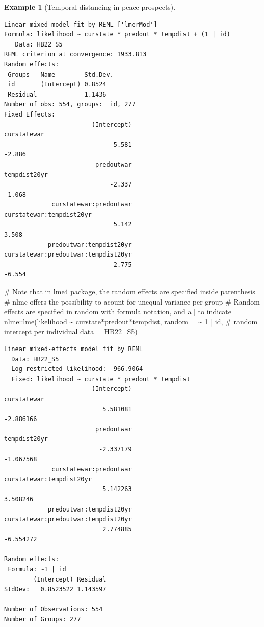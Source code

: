 \documentclass[
  11pt,
  letterpaper,
]{scrbook}
\newenvironment{Shaded}{\begin{snugshade}}{\end{snugshade}}
\newcommand{\AttributeTok}[1]{\textcolor[rgb]{0.40,0.45,0.13}{#1}}
\newcommand{\CommentTok}[1]{\textcolor[rgb]{0.37,0.37,0.37}{#1}}
\newcommand{\DecValTok}[1]{\textcolor[rgb]{0.68,0.00,0.00}{#1}}
\newcommand{\FunctionTok}[1]{\textcolor[rgb]{0.28,0.35,0.67}{#1}}
\newcommand{\NormalTok}[1]{\textcolor[rgb]{0.00,0.23,0.31}{#1}}
\newcommand{\SpecialCharTok}[1]{\textcolor[rgb]{0.37,0.37,0.37}{#1}}
\theoremstyle{definition}
\theoremstyle{definition}
\newtheorem{example}{Example}[chapter]
\theoremstyle{remark}
\begin{document}
\begin{example}[Temporal distancing in peace
prospects]
\begin{verbatim}
Linear mixed model fit by REML ['lmerMod']
Formula: likelihood ~ curstate * predout * tempdist + (1 | id)
   Data: HB22_S5
REML criterion at convergence: 1933.813
Random effects:
 Groups   Name        Std.Dev.
 id       (Intercept) 0.8524  
 Residual             1.1436  
Number of obs: 554, groups:  id, 277
Fixed Effects:
                        (Intercept)                          curstatewar  
                              5.581                               -2.886  
                         predoutwar                         tempdist20yr  
                             -2.337                               -1.068  
             curstatewar:predoutwar             curstatewar:tempdist20yr  
                              5.142                                3.508  
            predoutwar:tempdist20yr  curstatewar:predoutwar:tempdist20yr  
                              2.775                               -6.554  
\end{verbatim}

\begin{Shaded}
\begin{Highlighting}[]
\CommentTok{\#  Note that in \textasciigrave{}lme4\textasciigrave{} package, the random effects are specified inside parenthesis}
\CommentTok{\# nlme offers the possibility to acount for unequal variance per group}
\CommentTok{\# Random effects are specified in \textasciigrave{}random\textasciigrave{} with formula notation, and a | to indicate}
\NormalTok{nlme}\SpecialCharTok{::}\FunctionTok{lme}\NormalTok{(likelihood }\SpecialCharTok{\textasciitilde{}}\NormalTok{ curstate}\SpecialCharTok{*}\NormalTok{predout}\SpecialCharTok{*}\NormalTok{tempdist, }
          \AttributeTok{random =} \SpecialCharTok{\textasciitilde{}} \DecValTok{1} \SpecialCharTok{|}\NormalTok{ id, }\CommentTok{\# random intercept per individual}
          \AttributeTok{data =}\NormalTok{ HB22\_S5)}
\end{Highlighting}
\end{Shaded}

\begin{verbatim}
Linear mixed-effects model fit by REML
  Data: HB22_S5 
  Log-restricted-likelihood: -966.9064
  Fixed: likelihood ~ curstate * predout * tempdist 
                        (Intercept)                         curstatewar 
                           5.581081                           -2.886166 
                         predoutwar                        tempdist20yr 
                          -2.337179                           -1.067568 
             curstatewar:predoutwar            curstatewar:tempdist20yr 
                           5.142263                            3.508246 
            predoutwar:tempdist20yr curstatewar:predoutwar:tempdist20yr 
                           2.774885                           -6.554272 

Random effects:
 Formula: ~1 | id
        (Intercept) Residual
StdDev:   0.8523522 1.143597

Number of Observations: 554
Number of Groups: 277 
\end{verbatim}

\end{example}
\end{document}
